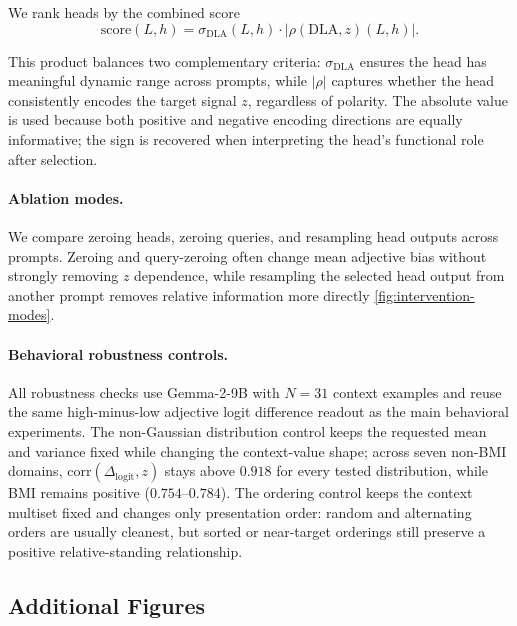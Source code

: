 \documentclass{article}
\newcommand{\logitdiff}{\ensuremath{\Delta_{\mathrm{logit}}}}
\begin{document}
We rank heads by the combined score
\[
\mathrm{score}(L,h) = \sigma_{\mathrm{DLA}}(L,h)\cdot \left|\rho(\mathrm{DLA}, z)(L,h)\right|.
\]

This product balances two complementary criteria: $\sigma_{\mathrm{DLA}}$ ensures the head has meaningful dynamic range across prompts, while $|\rho|$ captures whether the head consistently encodes the target signal $z$, regardless of polarity. The absolute value is used because both positive and negative encoding directions are equally informative; the sign is recovered when interpreting the head’s functional role after selection.

\paragraph{Ablation modes.}
We compare zeroing heads, zeroing queries, and resampling head outputs across prompts.
Zeroing and query-zeroing often change mean adjective bias without strongly removing $z$ dependence, while resampling the selected head output from another prompt removes relative information more directly \cref{fig:intervention-modes}.

\paragraph{Behavioral robustness controls.}
All robustness checks use Gemma-2-9B with $N=31$ context examples and reuse the same high-minus-low adjective logit difference readout as the main behavioral experiments.
The non-Gaussian distribution control keeps the requested mean and variance fixed while changing the context-value shape; across seven non-BMI domains, $\mathrm{corr}(\logitdiff,z)$ stays above $0.918$ for every tested distribution, while BMI remains positive ($0.754$--$0.784$).
The ordering control keeps the context multiset fixed and changes only presentation order: random and alternating orders are usually cleanest, but sorted or near-target orderings still preserve a positive relative-standing relationship.



\newpage
\subsection{Additional Figures}
\label{app:additional-figures}


\end{document}

